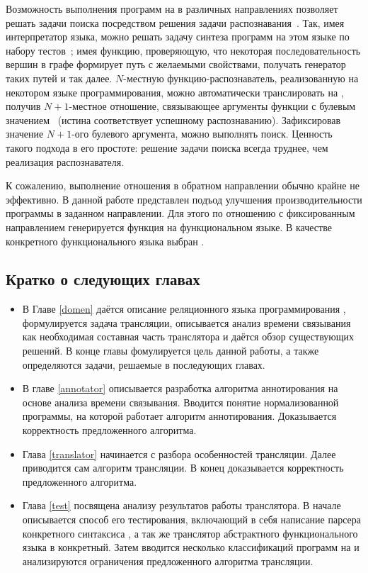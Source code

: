 Возможность выполнения программ на \miniKanren{} в различных направлениях позволяет решать задачи поиска посредством решения задачи распознавания~\cite{lozov2019relational}.
Так, имея интерпретатор языка, можно решать задачу синтеза программ на этом языке по набору тестов~\cite{byrd2017unified}; имея функцию, проверяющую, что некоторая последовательность вершин в графе формирует путь с желаемыми свойствами, получать генератор таких путей и так далее. 
$N$-местную функцию-распознаватель, реализованную на некотором языке программирования, можно автоматически транслировать на \miniKanren{}, получив $N+1$-местное отношение, связывающее аргументы функции с булевым значением~\cite{lozov2019relational} (истина соответствует успешному распознаванию). 
Зафиксировав значение $N+1$-ого булевого аргумента, можно выполнять поиск. 
Ценность такого подхода в его простоте: решение задачи поиска всегда труднее, чем реализация распознавателя. 

К сожалению, выполнение отношения в обратном направлении обычно крайне не эффективно. 
В данной работе представлен подъод улучшения производительности программы в заданном направлении.
Для этого по отношению с фиксированным направлением генерируется функция на функциональном языке.
В качестве конкретного функционального языка выбран \haskell{}.

\subsection*{Кратко о следующих главах}

\begin{itemize}
    \item В Главе \ref{domen} даётся описание реляционного языка программирования \miniKanren{}, формулируется задача трансляции, описывается анализ времени связывания как необходимая составная часть транслятора и даётся обзор существующих решений. В конце главы фомулируется цель данной работы, а также определяются задачи, решаемые в последующих главах.

    \item В главе \ref{annotator} описывается разработка алгоритма аннотирования на основе анализа времени связывания. Вводится понятие нормализованной программы, на которой работает алгоритм аннотирования. Доказывается корректность предложенного алгоритма.
    
    \item Глава \ref{translator} начинается с разбора особенностей трансляции. Далее приводится сам алгоритм трансляции. В конец доказывается корректность предложенного алгоритма.

    \item Глава \ref{test} посвящена анализу результатов работы транслятора. В начале описывается способ его тестирования, включающий в себя написание парсера конкретного синтаксиса \miniKanren{}, а так же транслятор абстрактного функционального языка в конкретный. Затем вводится несколько классификаций программ на \miniKanren{} и анализируются ограничения предложенного алгоритма трансляции.
\end{itemize}

